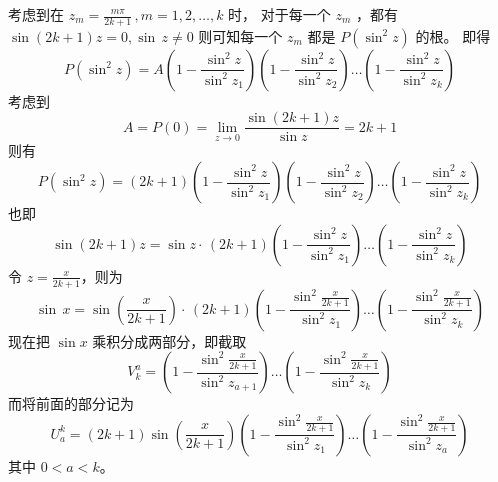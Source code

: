 考虑到在 $z_m=\frac{m\pi}{2k+1}\,,m=1,2,\dots,k $ 时， 对于每一个 $z_m$ ，都有 $ \sin(2k+1)z=0,\sin\,z\ne 0$
则可知每一个 $z_m$ 都是 $P(\sin^2z)$ 的根。 即得
\begin{equation}
P(\sin^2z)=A(1-\frac{\sin^2z}{\sin^2z_1})(1-\frac{\sin^2z}{\sin^2z_2})\dots(1-\frac{\sin^2z}{\sin^2z_k})
\end{equation}
考虑到
\begin{equation}
A=P(0)=\lim_{z\rightarrow0}\frac{\sin(2k+1)z}{\sin z}=2k+1
\end{equation}
则有
\begin{equation}
P(\sin^2z)=(2k+1)(1-\frac{\sin^2z}{\sin^2z_1})(1-\frac{\sin^2z}{\sin^2z_2})\dots(1-\frac{\sin^2z}{\sin^2z_k})
\end{equation}
也即
\begin{equation}
\sin(2k+1)z=\sin z\cdot\,(2k+1)(1-\frac{\sin^2z}{\sin^2z_1})\dots(1-\frac{\sin^2z}{\sin^2z_k})
\end{equation}
令 $z=\frac{x}{2k+1}$，则为
\begin{equation}
\sin\,x=\sin(\frac x{2k+1})\cdot\,(2k+1)(1-\frac{\sin^2\frac x{2k+1}}{\sin^2z_1})\dots(1-\frac{\sin^2\frac x{2k+1}}{\sin^2z_k})
\end{equation}
现在把 $\sin x$ 乘积分成两部分，即截取
\begin{equation}
V^a_k=(1-\frac{\sin^2\frac x{2k+1}}{\sin^2z_{a+1}})\dots(1-\frac{\sin^2\frac x{2k+1}}{\sin^2z_k})
\end{equation}
而将前面的部分记为
\begin{equation}
U^k_a=(2k+1)\sin(\frac x{2k+1})(1-\frac{\sin^2\frac x{2k+1}}{\sin^2z_1})\dots(1-\frac{\sin^2\frac x{2k+1}}{\sin^2z_{a}})
\end{equation}
其中 $0<a<k $。


